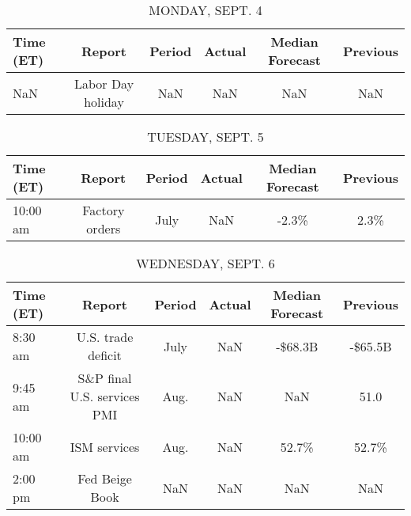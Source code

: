 \documentclass{article}%
\begin{document}
%
\normalsize%


\begin{table}[htbp]%
\caption{MONDAY, SEPT. 4}%
\centering%
\begin{adjustbox}{width=1\textwidth}%
\begin{tabular}{lccccc}
\toprule
Time (ET) &            Report & Period & Actual & Median Forecast & Previous \\
\midrule
      NaN & Labor Day holiday &    NaN &    NaN &             NaN &      NaN \\
\bottomrule
\end{tabular}
%
\end{adjustbox}%
\end{table}

%


\begin{table}[htbp]%
\caption{TUESDAY, SEPT. 5}%
\centering%
\begin{adjustbox}{width=1\textwidth}%
\begin{tabular}{lccccc}
\toprule
Time (ET) &         Report & Period & Actual & Median Forecast & Previous \\
\midrule
 10:00 am & Factory orders &   July &    NaN &           -2.3\% &     2.3\% \\
\bottomrule
\end{tabular}
%
\end{adjustbox}%
\end{table}

%


\begin{table}[htbp]%
\caption{WEDNESDAY, SEPT. 6}%
\centering%
\begin{adjustbox}{width=1\textwidth}%
\begin{tabular}{lccccc}
\toprule
Time (ET) &                      Report & Period & Actual & Median Forecast & Previous \\
\midrule
  8:30 am &          U.S. trade deficit &   July &    NaN &         -\$68.3B &  -\$65.5B \\
  9:45 am & S\&P final U.S. services PMI &   Aug. &    NaN &             NaN &     51.0 \\
 10:00 am &                ISM services &   Aug. &    NaN &           52.7\% &    52.7\% \\
  2:00 pm &              Fed Beige Book &    NaN &    NaN &             NaN &      NaN \\
\bottomrule
\end{tabular}
%
\end{adjustbox}%
\end{table}
\end{document}
